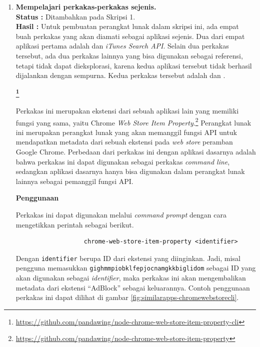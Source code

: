 \documentclass[a4paper,twoside]{article}
\begin{document}
\begin{enumerate}
		\item \textbf{Mempelajari perkakas-perkakas \cl sejenis.}\\
		{\bf Status :} Ditambahkan pada Skripsi 1.\\
		{\bf Hasil :} Untuk pembuatan perangkat lunak dalam skripsi ini, ada empat buah perkakas \cl yang akan diamati sebagai aplikasi sejenis. Dua dari empat aplikasi pertama adalah \chromewebstorecli dan \textit{iTunes Search API}. Selain dua perkakas tersebut, ada dua perkakas lainnya yang bisa digunakan sebagai referensi, tetapi tidak dapat dieksplorasi, karena kedua aplikasi tersebut tidak berhasil dijalankan dengan sempurna. Kedua perkakas tersebut adalah \ubercli dan \googlemapscli .

\textbf{\large{\chromewebstorecli}\footnote{\href{https://github.com/pandawing/node-chrome-web-store-item-property-cli}{https://github.com/pandawing/node-chrome-web-store-item-property-cli}}}
\label{sec:similarapps-chromewebstore}

Perkakas \cl ini merupakan ekstensi dari sebuah aplikasi lain yang memiliki fungsi yang \mbox{sama}, yaitu Chrome \textit{Web Store Item Property}.\footnote{\href{https://github.com/pandawing/node-chrome-web-store-item-property}{https://github.com/pandawing/node-chrome-web-store-item-property}} Perangkat lunak \chromewebstorecli ini merupakan perangkat lunak yang akan memanggil fungsi API untuk mendapatkan metadata dari sebuah ekstensi pada \textit{web store} peramban Google Chrome. Perbedaan dari perkakas ini dengan aplikasi dasarnya adalah bahwa perkakas ini dapat digunakan sebagai perkakas \textit{command line}, sedangkan aplikasi dasarnya hanya bisa digunakan dalam perangkat lunak lainnya sebagai pemanggil fungsi API.

\textbf{Penggunaan}
\label{sec:similarapps-chromewebstore-usage}

Perkakas ini dapat digunakan melalui \textit{command prompt} dengan cara mengetikkan perintah sebagai berikut.

\begin{verbatim}
                   chrome-web-store-item-property <identifier>
\end{verbatim}

Dengan \verb|identifier| berupa ID dari ekstensi yang diinginkan. Jadi, misal pengguna \mbox{memasukkan} \verb|gighmmpiobklfepjocnamgkkbiglidom| sebagai ID yang akan digunakan sebagai \textit{identifier}, maka perkakas ini akan mengembalikan metadata dari ekstensi ``AdBlock'' sebagai keluarannya. Contoh \mbox{penggunaan} perkakas ini dapat dilihat di gambar \ref{fig:similarapps-chromewebstorecli}.


\end{enumerate}
\end{document}
